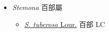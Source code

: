 
  \begin{itemize}
 \item[] \textit{Stemona} 百部屬
                    
  \begin{itemize}
        \item[] \href{http://www.theplantlist.org/tpl1.1/search?q=Stemona+tuberosa}{\textit{S. tuberosa} Lour.}   百部 LC
  \end{itemize}
  \end{itemize}
